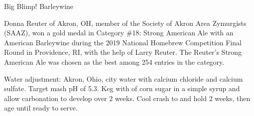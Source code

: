\stylesection{\styleamericanbarleywine}

\begin{recipe}{Big Blimp! Barleywine}

\begin{aboutblock}
Donna Reuter of Akron, OH, member of the Society of Akron Area Zymurgists (SAAZ),
won a gold medal in Category \#18: Strong American Ale with an American Barleywine
during the 2019 National Homebrew Competition Final Round in Providence, RI, with
the help of Larry Reuter. The Reuter's Strong American Ale was chosen as the best
among 254 entries in the category.
\sourceaha
\end{aboutblock}


\begin{methodandtiming}
 
\begin{mashsteps}
\end{mashsteps}

\begin{fermentationsteps}

\end{fermentationsteps}

\begin{directions}
Water adjustment: Akron, Ohio, city water with  calcium chloride and
 calcium sulfate. Target mash pH of 5.3. Keg with 
of corn sugar in a simple syrup and allow carbonation to develop over 2 weeks.
Cool crash to  and hold 2 weeks, then age until ready to serve.
\end{directions}

\end{methodandtiming}

\recipebreak

\begin{ingredientsblock}

\begin{malts}
\end{malts}


\end{ingredientsblock}
\end{recipe}
